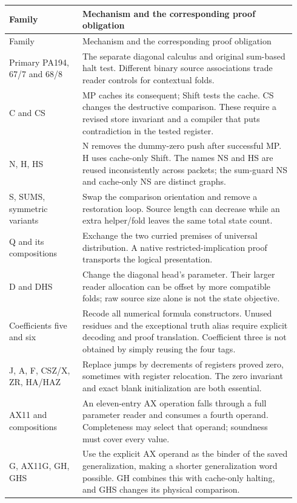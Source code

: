 \documentclass[10pt,letterpaper]{article}
\begin{document}
\begin{longtable}{@{}p{0.24\linewidth}p{0.70\linewidth}@{}}
\toprule Family & Mechanism and the corresponding proof obligation\\\midrule\endfirsthead
\toprule Family & Mechanism and the corresponding proof obligation\\\midrule\endhead
Primary PA194, 67/7 and 68/8&The separate diagonal calculus and original sum-based halt test. Different binary source associations trade reader controls for contextual folds.\\[4pt]
C and CS&MP caches its consequent; Shift tests the cache. CS changes the destructive comparison. These require a revised store invariant and a compiler that puts contradiction in the tested register.\\[4pt]
N, H, HS&N removes the dummy-zero push after successful MP. H uses cache-only Shift. The names NS and HS are reused inconsistently across packets; the sum-guard NS and cache-only NS are distinct graphs.\\[4pt]
S, SUMS, symmetric variants&Swap the comparison orientation and remove a restoration loop. Source length can decrease while an extra helper/fold leaves the same total state count.\\[4pt]
Q and its compositions&Exchange the two curried premises of universal distribution. A native restricted-implication proof transports the logical presentation.\\[4pt]
D and DHS&Change the diagonal head's parameter. Their larger reader allocation can be offset by more compatible folds; raw source size alone is not the state objective.\\[4pt]
Coefficients five and six&Recode all numerical formula constructors. Unused residues and the exceptional truth alias require explicit decoding and proof translation. Coefficient three is not obtained by simply reusing the four tags.\\[4pt]
J, A, F, CSZ/X, ZR, HA/HAZ&Replace jumps by decrements of registers proved zero, sometimes with register relocation. The zero invariant and exact blank initialization are both essential.\\[4pt]
AX11 and compositions&An eleven-entry AX operation falls through a full parameter reader and consumes a fourth operand. Completeness may select that operand; soundness must cover every value.\\[4pt]
G, AX11G, GH, GHS&Use the explicit AX operand as the binder of the saved generalization, making a shorter generalization word possible. GH combines this with cache-only halting, and GHS changes its physical comparison.\\[4pt]

\end{longtable}
\end{document}
